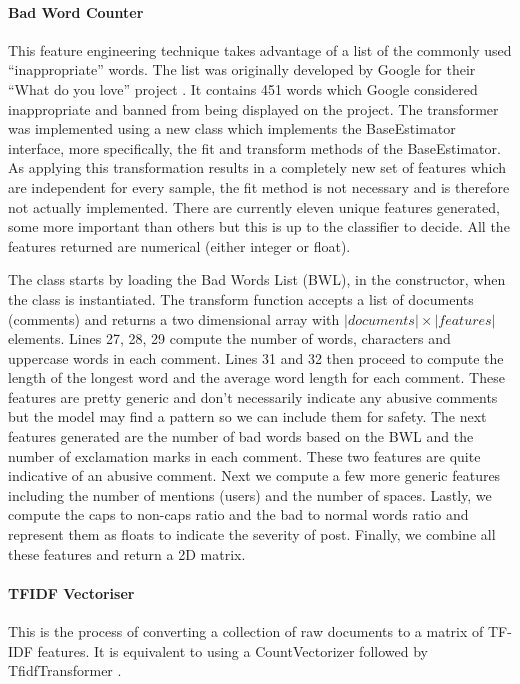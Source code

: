 \paragraph{Bad Word Counter} This feature engineering technique takes advantage of a list of the commonly used ``inappropriate'' words. The list was originally developed by Google for their ``What do you love'' project \cite{GitHub:GoogleBadWordList}. It contains 451 words which Google considered inappropriate and banned from being displayed on the project. The transformer was implemented using a new class which implements the BaseEstimator interface, more specifically, the fit and transform methods of the BaseEstimator. As applying this transformation results in a completely new set of features which are independent for every sample, the fit method is not necessary and is therefore not actually implemented. There are currently eleven unique features generated, some more important than others but this is up to the classifier to decide. All the features returned are numerical (either integer or float).

The class starts by loading the Bad Words List (BWL), in the constructor, when the class is instantiated. The transform function accepts a list of documents (comments) and returns a two dimensional array with $|documents| \times |features|$ elements. Lines 27, 28, 29 compute the number of words, characters and uppercase words in each comment. Lines 31 and 32 then proceed to compute the length of the longest word and the average word length for each comment. These features are pretty generic and don't necessarily indicate any abusive comments but the model may find a pattern so we can include them for safety. The next features generated are the number of bad words based on the BWL and the number of exclamation marks in each comment. These two features are quite indicative of an abusive comment. Next we compute a few more generic features including the number of mentions (users) and the number of spaces. Lastly, we compute the caps to non-caps ratio and the bad to normal words ratio and represent them as floats to indicate the severity of post. Finally, we combine all these features and return a 2D matrix.

\paragraph{TFIDF Vectoriser} This is the process of converting a collection of raw documents to a matrix of TF-IDF features. It is equivalent to using a CountVectorizer followed by TfidfTransformer \cite{ScikitLearn:TFIDFVectorizer}. 

